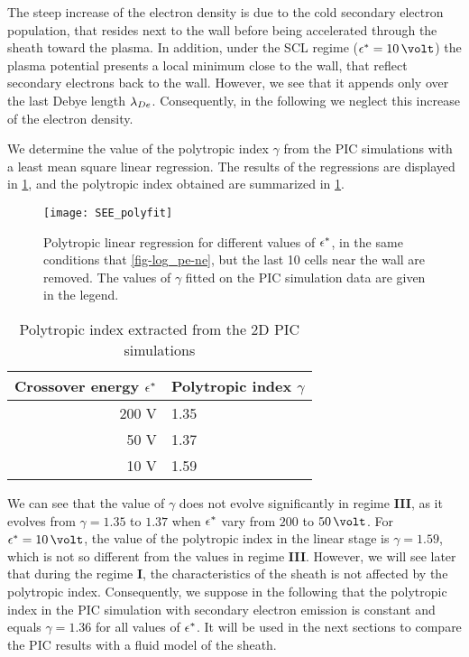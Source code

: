 The steep increase of the electron density is due to the cold secondary electron population, that resides next to the wall before being accelerated through the sheath toward the plasma.
In addition, under the \ac{SCL} regime ($\crover = 10\,\volt$) the plasma potential presents a local minimum close to the wall, that reflect secondary electrons back to the wall.
However, we see that it appends only over the last Debye length $\lambda_{De}$.
Consequently, in the following we neglect this increase of the electron density.

We determine the value of the polytropic index $\gamma$ from the \ac{PIC} simulations with a least mean square linear regression.
The results of the regressions are displayed in \cref{fig-polyfit_see}, and the polytropic index obtained are summarized in \cref{tab-summarygamma}.


\begin{figure}[!htb]
  \centering
  \texttt{[image: SEE\_polyfit]}
  \caption{Polytropic linear regression for different values of $\epsilon^{*}$, in the same conditions that \cref{fig-log_pe-ne}, but the last 10 cells near the wall are removed. The values of $\gamma$ fitted on the \acs{PIC} simulation data are given in the legend.}
  \label{fig-polyfit_see}
\end{figure}

\begin{table}[!htb]
  \centering
  \caption{Polytropic index extracted from the \acs{2D}  \acs{PIC} simulations}
  \label{tab-summarygamma}
  \begin{tabular}{@{}r l@{}} \toprule
  Crossover energy $\epsilon^{*}$ & Polytropic index $\gamma$ \\ \midrule
  200 V & 1.35 \\
  50 V & 1.37 \\
  10 V & 1.59 \\
  \bottomrule
  \end{tabular}
\end{table}


We can see that the value of $\gamma$ does not evolve significantly in regime {\bf III}, as it evolves from $\gamma=1.35$  to $1.37$ when $\epsilon^{*}$ vary from $200$ to $50\,\volt$.
For $\crover=10\,\volt$, the value of the polytropic index in the linear stage is $\gamma=1.59$, which is not so different from the values in regime {\bf III}.
However, we will see later that during the regime {\bf I}, the characteristics of the sheath is not affected by the polytropic index. 
Consequently, we suppose in the following that the polytropic index in the \ac{PIC} simulation with secondary electron emission is constant and equals $\gamma=1.36$ for all values of $\epsilon^{*}$.
It will be used in the next sections to compare the \ac{PIC} results with a fluid model of the sheath.

